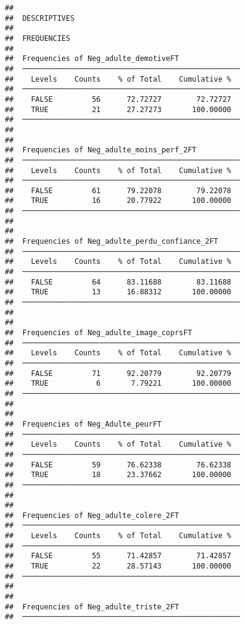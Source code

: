 \documentclass[
]{article}
\begin{document}
\begin{verbatim}
## 
##  DESCRIPTIVES
## 
##  FREQUENCIES
## 
##  Frequencies of Neg_adulte_demotiveFT               
##  ────────────────────────────────────────────────── 
##    Levels    Counts    % of Total    Cumulative %   
##  ────────────────────────────────────────────────── 
##    FALSE         56      72.72727        72.72727   
##    TRUE          21      27.27273       100.00000   
##  ────────────────────────────────────────────────── 
## 
## 
##  Frequencies of Neg_adulte_moins_perf_2FT           
##  ────────────────────────────────────────────────── 
##    Levels    Counts    % of Total    Cumulative %   
##  ────────────────────────────────────────────────── 
##    FALSE         61      79.22078        79.22078   
##    TRUE          16      20.77922       100.00000   
##  ────────────────────────────────────────────────── 
## 
## 
##  Frequencies of Neg_adulte_perdu_confiance_2FT      
##  ────────────────────────────────────────────────── 
##    Levels    Counts    % of Total    Cumulative %   
##  ────────────────────────────────────────────────── 
##    FALSE         64      83.11688        83.11688   
##    TRUE          13      16.88312       100.00000   
##  ────────────────────────────────────────────────── 
## 
## 
##  Frequencies of Neg_adulte_image_coprsFT            
##  ────────────────────────────────────────────────── 
##    Levels    Counts    % of Total    Cumulative %   
##  ────────────────────────────────────────────────── 
##    FALSE         71      92.20779        92.20779   
##    TRUE           6       7.79221       100.00000   
##  ────────────────────────────────────────────────── 
## 
## 
##  Frequencies of Neg_Adulte_peurFT                   
##  ────────────────────────────────────────────────── 
##    Levels    Counts    % of Total    Cumulative %   
##  ────────────────────────────────────────────────── 
##    FALSE         59      76.62338        76.62338   
##    TRUE          18      23.37662       100.00000   
##  ────────────────────────────────────────────────── 
## 
## 
##  Frequencies of Neg_adulte_colere_2FT               
##  ────────────────────────────────────────────────── 
##    Levels    Counts    % of Total    Cumulative %   
##  ────────────────────────────────────────────────── 
##    FALSE         55      71.42857        71.42857   
##    TRUE          22      28.57143       100.00000   
##  ────────────────────────────────────────────────── 
## 
## 
##  Frequencies of Neg_adulte_triste_2FT               
##  ────────────────────────────────────────────────── 

\end{verbatim}
\end{document}
